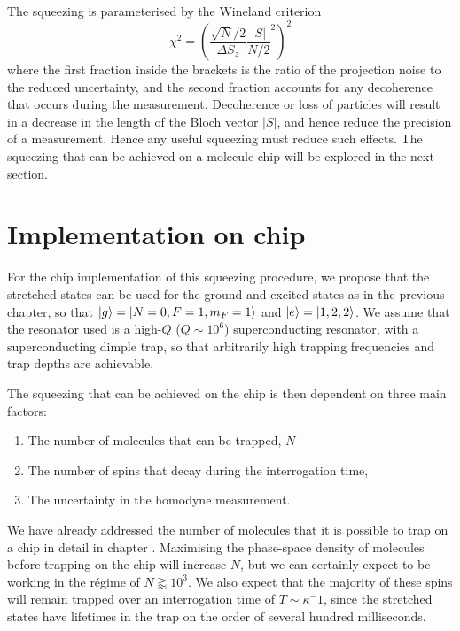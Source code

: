 The squeezing is parameterised by the Wineland criterion~\cite{}
%
\begin{equation}
  \chi^2 = \left(\frac{\sqrt{N}/2}{\Delta S_z}\frac{|S|}{N/2}^2\right)^2
\end{equation}
%
where the first fraction inside the brackets is the ratio of the projection
noise to the reduced uncertainty, and the second fraction accounts for any
decoherence that occurs during the measurement. Decoherence or loss of
particles will result in a decrease in the length of the Bloch vector $|S|$,
and hence reduce the precision of a measurement. Hence any useful squeezing
must reduce such effects. The squeezing that can be achieved on a \CaF{}
molecule chip will be explored in the next section.

\section{Implementation on \CaF{} chip}

For the \CaF{} chip implementation of this squeezing procedure, we propose that
the stretched-states can be used for the ground and excited states as in the
previous chapter, so that $\ket{g} = \ket{N=0, F=1, m_F=1}$ and $\ket{e} =
\ket{1, 2, 2}$. We assume that the resonator used is a high-$Q$ ($Q\sim10^6$)
superconducting resonator, with a superconducting dimple trap, so that
arbitrarily high trapping frequencies and trap depths are achievable.

The squeezing that can be achieved on the chip is then dependent on three main
factors:
%
\begin{enumerate}
    \item The number of molecules that can be trapped, $N$
    \item The number of spins that decay during the interrogation time,
    \item The uncertainty in the homodyne measurement.
\end{enumerate}

We have already addressed the number of molecules that it is possible to trap
on a chip in detail in chapter . Maximising the phase-space
density of molecules before trapping on the chip will increase $N$, but we can
certainly expect to be working in the r\'egime of $N\gtrapprox10^3$. We also
expect that the majority of these spins will remain trapped over an
interrogation time of $T\sim\kappa^-1$, since the stretched states have
lifetimes in the trap on the order of several hundred milliseconds.

